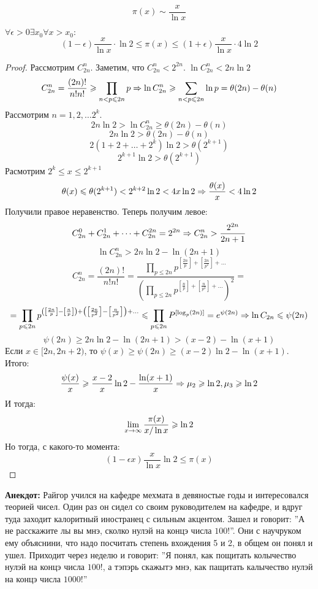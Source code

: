\begin{theorem}
    \[\pi(x) \sim \frac{x}{\ln x}\]
\end{theorem}
\begin{theorem}[Чебышев]
    \(\forall \epsilon > 0 \exists x_0 \forall x > x_0:\)
    \[(1 - \epsilon)\frac{x}{\ln x}\cdot \ln 2 \le \pi(x) \le (1 + \epsilon) \frac{x}{\ln x} \cdot 4\ln 2\]
\end{theorem}
\begin{proof}
    Рассмотрим \(C_{2n}^n\). Заметим, что \(C_{2n}^n < 2^{2n}\). \(\ln C_{2n}^n < 2n \ln 2\)
    \[C_{2n}^n = \frac{(2n)!}{n!n!} \geqslant \prod_{n < p \leqslant 2n} p \Rightarrow \ln C_{2n}^n \geqslant \sum_{n < p \leqslant 2n} \ln p = \theta(2n) - \theta(n)\]
    Рассмотрим \(n = 1, 2, \dots 2^k\).
    \[2n \ln 2 > \ln C_{2n}^n \ge \theta(2n) - \theta(n)\]
    \[2n \ln 2 > \theta(2n) - \theta(n)\]
    \[2(1 + 2 + \dots + 2^k)\ln 2 > \theta\left(2^{k + 1}\right)\]
    \[2^{k + 1}\ln 2 > \theta\left(2^{k + 1}\right)\]
    Расмотрим \(2^k \le x \le 2^{k + 1}\)
    \[\theta(x) \leqslant \theta(2^{k + 1}) < 2^{k + 2}\ln 2 < 4x\ln 2 \Rightarrow \frac{\theta(x)}{x} < 4\ln 2\]
    Получили правое неравенство. Теперь получим левое:
    \[C_{2n}^0 + C_{2n}^1 + \dots + C_{2n}^{2n} = 2^{2n} \Rightarrow C_{2n}^n > \frac{2^{2n}}{2n + 1}\]
    \[\ln C_{2n}^n > 2n \ln 2 - \ln(2n + 1)\]
    \[C_{2n}^n = \frac{(2n)!}{n!n!} = \frac{\prod_{p \le 2n}p^{\left[\frac{2n}{p}\right] + \left[\frac{2n}{p^2}\right] + \dots}}{\left(\prod_{p \le 2n}p^{\left[\frac{n}{p}\right] + \left[\frac{n}{p^2}\right] + \dots}\right)^2} =\]
    \[= \prod_{p \leqslant 2n}p^{\left(\left[\frac{2n}{p}\right] - \left[\frac{n}{p}\right]\right) + \left(\left[\frac{2n}{p^2}\right] - \left[\frac{n}{p^2}\right]\right) + \dots} \leqslant \prod_{p \leqslant 2n} P^{[\log_p(2n)]} = e^{\psi(2n)} \Rightarrow \ln C_{2n} \leqslant \psi(2n)\]
    \[\psi(2n) \ge 2n\ln 2 - \ln(2n + 1) > (x - 2) - \ln(x + 1)\]
    Если  \(x \in [2n, 2n + 2)\), то \(\psi(x) \ge \psi(2n) \ge (x - 2)\ln2 - \ln(x + 1)\). Итого:
    \[\frac{\psi(x)}{x} \geqslant \frac{x - 2}{x}\ln 2 - \frac{\ln (x + 1)}{x} \Rightarrow \mu_2 \geqslant \ln 2, \mu_3 \geqslant \ln 2\]
    И тогда:
    \[\lim_{x \rightarrow \infty} \frac{\pi(x)}{x/\ln x} \geqslant \ln 2\]
    Но тогда, с какого-то момента:
    \[(1 - \epsilon x)\frac{x}{\ln x} \ln 2 \le \pi(x)\]
\end{proof}

\textbf{Анекдот:} Райгор учился на кафедре мехмата в девяностые годы и интересовался теорией чисел. Один раз он сидел со своим руководителем на кафедре, и вдруг туда заходит калоритный иностранец с сильным акцентом. Зашел и говорит: ''А не расскажите лы вы мнэ, сколко нулэй на концэ числа \(100!\)''. Они с научруком ему объяснини, что надо посчитать степень вхождения 5 и 2, в общем он понял и ушел. Приходит через неделю и говорит: ''Я понял, как пощитать колычество нулэй на концэ числа \(100!\), а тэпэрь скажытэ мнэ, как пащитать калычество нулэй на концэ числа \(1000!\)''

